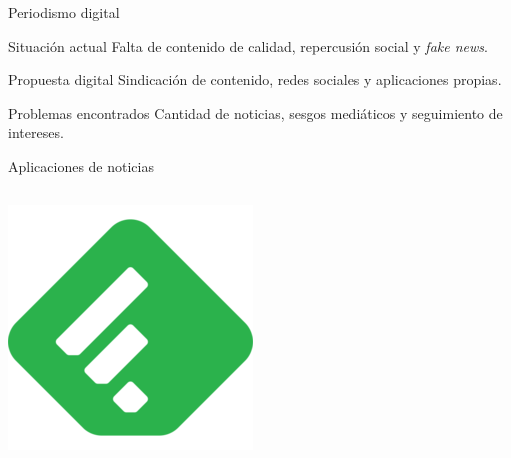 \documentclass[12pt]{beamer}
\begin{document}
		\begin{frame}{Periodismo digital}
			\begin{block}{Situación actual}
				Falta de contenido de calidad, repercusión social y \textit{fake news}.
			\end{block}
			\begin{block}{Propuesta digital}
				Sindicación de contenido, redes sociales y aplicaciones propias.
			\end{block}
			\begin{block}{Problemas encontrados}
				Cantidad de noticias, sesgos mediáticos y seguimiento de intereses.
			\end{block}
		\end{frame}

		\begin{frame}{Aplicaciones de noticias}
			\begin{columns}[onlytextwidth]
				\begin{column}{0.3\textwidth}
					\includegraphics[width=\textwidth,height=0.8\textheight,keepaspectratio]{img/alternativas/feedly_logo}
				\end{column}
				\begin{column}{0.3\textwidth}

\end{column}
\end{columns}
\end{frame}
\end{document}
